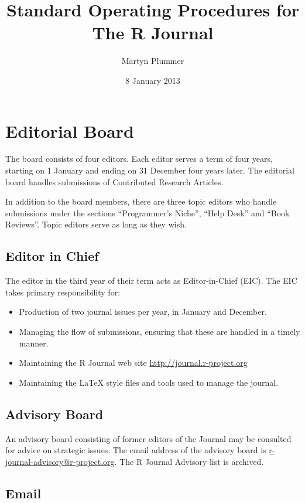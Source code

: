 \documentclass[11pt]{article}
\begin{document}
\title{Standard Operating Procedures for The R Journal}
\author{Martyn Plummer}
\date{8 January 2013}
\maketitle

\section{Editorial Board}

The board consists of four editors. Each editor serves a term of four
years, starting on 1 January and ending on 31 December four years
later. The editorial board handles submissions of Contributed Research
Articles.

In addition to the board members, there are three topic editors who
handle submissions under the sections ``Programmer's Niche'', ``Help
Desk'' and ``Book Reviews''. Topic editors serve as long as they wish.

\subsection{Editor in Chief}

The editor in the third year of their term acts as Editor-in-Chief
(EIC). The EIC takes primary responsibility for:
\begin{itemize}
\item Production of two journal issues per year, in January and December.
\item Managing the flow of submissions, ensuring that these are
  handled in a timely manner.
\item Maintaining the R Journal web site \url{http://journal.r-project.org}
\item Maintaining the LaTeX style files and tools used to manage the
  journal.
\end{itemize}

\subsection{Advisory Board}

An advisory board consisting of former editors of the Journal may be
consulted for advice on strategic issues.  The email address of the
advisory board is \url{r-journal-advisory@r-project.org}. The R
Journal Advisory list is archived.

\subsection{Email}
\end{document}
